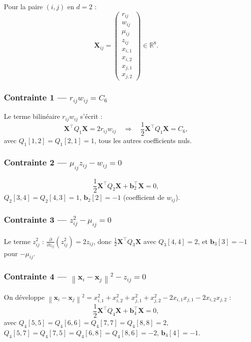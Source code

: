 \documentclass[12pt,a4paper]{article}
\newcommand{\R}{\mathbb{R}}
\newcommand{\norm}[1]{\left\|#1\right\|}
\begin{document}
Pour la paire $(i,j)$ en $d=2$ :
\[
  \mathbf{X}_{ij} = \begin{pmatrix}
    r_{ij} \\ w_{ij} \\ \mu_{ij} \\ z_{ij} \\
    x_{i,1} \\ x_{i,2} \\ x_{j,1} \\ x_{j,2}
  \end{pmatrix}
  \in \R^8.
\]

\subsubsection{Contrainte 1 --- \textcolor{contrainteBleu}{$r_{ij}w_{ij} = C_6$}}

Le terme bilinéaire $r_{ij}w_{ij}$ s'écrit :
\[
  \mathbf{X}^\top Q_1 \mathbf{X} = 2r_{ij}w_{ij}
  \quad\Rightarrow\quad
  \frac{1}{2}\mathbf{X}^\top Q_1 \mathbf{X} = C_6,
\]
avec $Q_1[1,2]=Q_1[2,1]=1$, tous les autres coefficients nuls.

\subsubsection{Contrainte 2 --- \textcolor{contrainteOrange}{$\mu_{ij}z_{ij} - w_{ij} = 0$}}

\[
  \frac{1}{2}\mathbf{X}^\top Q_2 \mathbf{X} + \mathbf{b}_2^\top \mathbf{X} = 0,
\]
$Q_2[3,4]=Q_2[4,3]=1$, $\mathbf{b}_2[2]=-1$ (coefficient de $w_{ij}$).

\subsubsection{Contrainte 3 --- \textcolor{contrainteRose}{$z_{ij}^2 - \mu_{ij} = 0$}}

Le terme $z_{ij}^2$ : $\frac{\partial}{\partial z_{ij}}(z_{ij}^2)=2z_{ij}$,
donc $\frac{1}{2}\mathbf{X}^\top Q_3\mathbf{X}$ avec $Q_3[4,4]=2$,
et $\mathbf{b}_3[3]=-1$ pour $-\mu_{ij}$.

\subsubsection{Contrainte 4 --- \textcolor{contrainteVert}{$\norm{\mathbf{x}_i-\mathbf{x}_j}^2 - z_{ij} = 0$}}

On développe $\norm{\mathbf{x}_i-\mathbf{x}_j}^2
= x_{i,1}^2+x_{i,2}^2+x_{j,1}^2+x_{j,2}^2-2x_{i,1}x_{j,1}-2x_{i,2}x_{j,2}$ :
\[
  \frac{1}{2}\mathbf{X}^\top Q_4 \mathbf{X} + \mathbf{b}_4^\top \mathbf{X} = 0,
\]
avec $Q_4[5,5]=Q_4[6,6]=Q_4[7,7]=Q_4[8,8]=2$,
$Q_4[5,7]=Q_4[7,5]=Q_4[6,8]=Q_4[8,6]=-2$,
$\mathbf{b}_4[4]=-1$.
\end{document}
